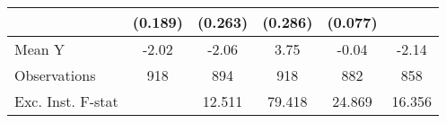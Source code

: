 {\begin{tabular}{l*{5}{c}}
            &     (0.189)         &     (0.263)         &     (0.286)         &     (0.077)         &                     \\
\midrule
Mean Y      &       -2.02         &       -2.06         &        3.75         &       -0.04         &       -2.14         \\
Observations&         918         &         894         &         918         &         882         &         858         \\
Exc. Inst. F-stat&                     &      12.511         &      79.418         &      24.869         &      16.356         \\
\bottomrule
\end{tabular}
}

